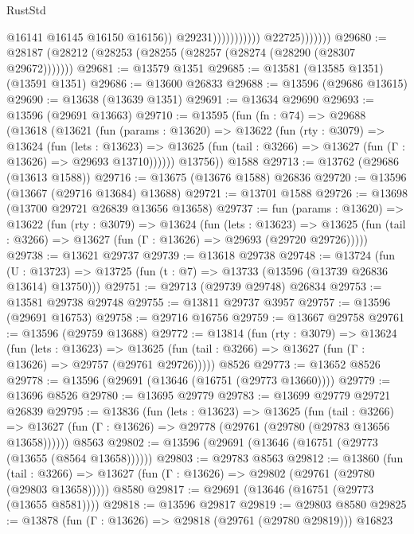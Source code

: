 \begin{lexlean}{RustStd}
\begin{coremodule}
                                            @16141
                                            @16145
                                            @16150
                                            @16156))
                                        @29231)))))))))))
                  @22725)))))))
@29680 := @28187 (@28212 (@28253 (@28255 (@28257 (@28274 (@28290 (@28307 @29672)))))))
@29681 := @13579 @1351
@29685 := @13581 (@13585 @1351) (@13591 @1351)
@29686 := @13600 @26833
@29688 := @13596 (@29686 @13615)
@29690 := @13638 (@13639 @1351)
@29691 := @13634 @29690
@29693 := @13596 (@29691 @13663)
@29710 := @13595
    (fun (fn : @74) =>
    @29688
      (@13618
        (@13621
          (fun (params : @13620) =>
          @13622
            (fun (rty : @3079) =>
            @13624
              (fun (lets : @13623) =>
              @13625 (fun (tail : @3266) => @13627 (fun (Γ : @13626) => @29693 @13710))))))
        @13756))
    @1588
@29713 := @13762 (@29686 (@13613 @1588))
@29716 := @13675 (@13676 @1588) @26836
@29720 := @13596 (@13667 (@29716 @13684) @13688)
@29721 := @13701 @1588
@29726 := @13698 (@13700 @29721 @26839 @13656 @13658)
@29737 := fun (params : @13620) =>
  @13622
    (fun (rty : @3079) =>
    @13624
      (fun (lets : @13623) =>
      @13625 (fun (tail : @3266) => @13627 (fun (Γ : @13626) => @29693 (@29720 @29726)))))
@29738 := @13621 @29737
@29739 := @13618 @29738
@29748 := @13724
    (fun (U : @13723) => @13725 (fun (t : @7) => @13733 (@13596 (@13739 @26836 @13614) @13750)))
@29751 := @29713 (@29739 @29748) @26834
@29753 := @13581 @29738 @29748
@29755 := @13811 @29737 @3957
@29757 := @13596 (@29691 @16753)
@29758 := @29716 @16756
@29759 := @13667 @29758
@29761 := @13596 (@29759 @13688)
@29772 := @13814
    (fun (rty : @3079) =>
    @13624
      (fun (lets : @13623) =>
      @13625 (fun (tail : @3266) => @13627 (fun (Γ : @13626) => @29757 (@29761 @29726)))))
    @8526
@29773 := @13652 @8526
@29778 := @13596 (@29691 (@13646 (@16751 (@29773 @13660))))
@29779 := @13696 @8526
@29780 := @13695 @29779
@29783 := @13699 @29779 @29721 @26839
@29795 := @13836
    (fun (lets : @13623) =>
    @13625
      (fun (tail : @3266) =>
      @13627 (fun (Γ : @13626) => @29778 (@29761 (@29780 (@29783 @13656 @13658))))))
    @8563
@29802 := @13596 (@29691 (@13646 (@16751 (@29773 (@13655 (@8564 @13658))))))
@29803 := @29783 @8563
@29812 := @13860
    (fun (tail : @3266) => @13627 (fun (Γ : @13626) => @29802 (@29761 (@29780 (@29803 @13658)))))
    @8580
@29817 := @29691 (@13646 (@16751 (@29773 (@13655 @8581))))
@29818 := @13596 @29817
@29819 := @29803 @8580
@29825 := @13878 (fun (Γ : @13626) => @29818 (@29761 (@29780 @29819))) @16823

\end{coremodule}
\end{lexlean}
